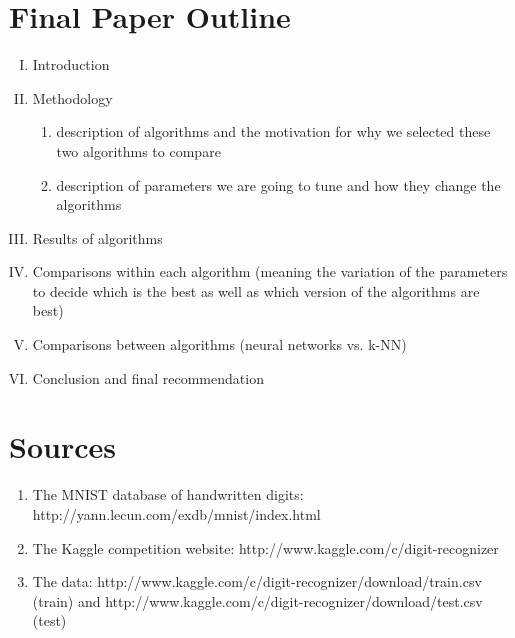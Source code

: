 \documentclass[11pt,a4paper]{article}
\begin{document}
\section*{Final Paper Outline}
\begin{enumerate}[I.]
\item Introduction
\item Methodology
\begin{enumerate}
\item description of algorithms and the motivation for why we selected these two algorithms to compare
\item description of parameters we are going to tune and how they change the algorithms
\end{enumerate}
\item Results of algorithms
\item Comparisons within each algorithm (meaning the variation of the parameters to decide which is the best as well as which version of the algorithms are best)
\item Comparisons between algorithms (neural networks vs. k-NN)
\item Conclusion and final recommendation
\end{enumerate}

\section*{Sources}
\begin{enumerate}
\item The MNIST database of handwritten digits: http://yann.lecun.com/exdb/mnist/index.html
\item The Kaggle competition website: http://www.kaggle.com/c/digit-recognizer 
\item The data:  http://www.kaggle.com/c/digit-recognizer/download/train.csv (train) and http://www.kaggle.com/c/digit-recognizer/download/test.csv (test)
\end{enumerate}
\end{document}
